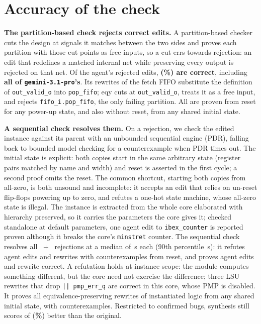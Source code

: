 \documentclass[sigconf,nonacm]{acmart}
\begin{document}
\section{Accuracy of the check}
\label{sec:right}

\textbf{The partition-based check rejects correct edits.} A partition-based
checker cuts the design at signals it matches between the two sides and proves
each partition with those cut points as free inputs, so a cut errs towards
rejection: an edit that redefines a matched internal net while preserving every
output is rejected on that net. Of the agent's \AGrefused{} rejected edits,
\textbf{\AGfalseRej{} (\AGfalseRejPct\%) are correct}, including
\textbf{all \AGproRef{} of \texttt{gemini-3.1-pro}'s}. Its rewrites of the
fetch FIFO substitute the definition of \texttt{out\_valid\_o} into
\texttt{pop\_fifo}; eqy cuts at \texttt{out\_valid\_o}, treats it as a free
input, and rejects \texttt{fifo\_i.pop\_fifo}, the only failing partition. All
\AGfalseRej{} are proven from reset for any power-up state, and \AGanyState{}
also without reset, from any shared initial state.

\textbf{A sequential check resolves them.} On a rejection, we check the edited
instance against its parent with an unbounded sequential engine (PDR), falling
back to bounded model checking for a counterexample when PDR times out. The
initial state is explicit: both copies start in the same arbitrary state
(register pairs matched by name and width) and reset is asserted in the first
cycle; a second proof omits the reset. The common shortcut, starting both copies from all-zero,
is both unsound and incomplete: it accepts an edit that relies on un-reset
flip-flops powering up to zero, and refutes a one-hot state machine, whose
all-zero state is illegal. The instance is extracted from the whole core
elaborated with hierarchy preserved, so it carries the parameters the core
gives it; checked standalone at default parameters, one agent edit to
\texttt{ibex\_counter} is reported proven although it breaks the core's
\texttt{minstret} counter. The sequential check resolves all
\AGrefused{}~+~\RWbroken{} rejections at a median of \SSmedian\,s each (90th
percentile \SSpNinety\,s): it refutes \AGbugs{} agent edits and
\RWbmcConfirmed{} rewrites with counterexamples from reset, and proves
\AGfalseRej{} agent edits and \RWfalseRej{} rewrite correct. A refutation holds
at instance scope: the module computes something different, but the core need
not exercise the difference; three LSU rewrites that drop
\texttt{|| pmp\_err\_q} are correct in this core, whose PMP is disabled.
It proves all \RWctlProven{} equivalence-preserving rewrites of instantiated
logic from any shared initial state, with \textbf{\RWctlConfirmed{}}
counterexamples. Restricted to confirmed bugs, synthesis still scores
\RWconfEither{} of \RWconfSynth{} (\textbf{\RWconfEitherPct\%}) better than the
original.
\end{document}
